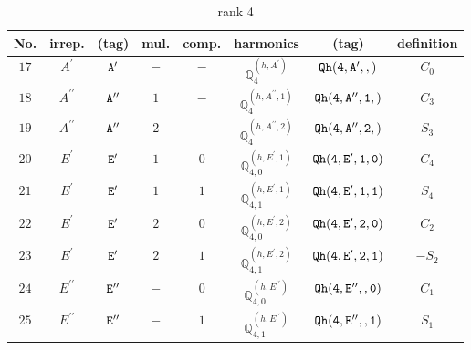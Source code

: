 \documentclass[fleqn,8pt]{jsarticle}
\begin{document}
\begin{table}[ht!]
\begin{center}
\caption{rank 4}
\renewcommand{\arraystretch}{1.3}
\begin{tabular}{cccccccc} \hline \hline
No. & irrep. & (tag) & mul. & comp. & harmonics & (tag) & definition \\ \hline
$ 17 $ & $ A^{\prime} $ & $ {\tt A'} $ & $ - $ & $ - $ & $ \mathbb{Q}_{4}^{(h,A^{\prime})} $ & $ {\tt Qh(4,A',,)} $ & $ C_{0} $ \\
$ 18 $ & $ A^{\prime\prime} $ & $ {\tt A''} $ & $ 1 $ & $ - $ & $ \mathbb{Q}_{4}^{(h,A^{\prime\prime},1)} $ & $ {\tt Qh(4,A'',1,)} $ & $ C_{3} $ \\
$ 19 $ & $ A^{\prime\prime} $ & $ {\tt A''} $ & $ 2 $ & $ - $ & $ \mathbb{Q}_{4}^{(h,A^{\prime\prime},2)} $ & $ {\tt Qh(4,A'',2,)} $ & $ S_{3} $ \\
$ 20 $ & $ E^{\prime} $ & $ {\tt E'} $ & $ 1 $ & $ 0 $ & $ \mathbb{Q}_{4,0}^{(h,E^{\prime},1)} $ & $ {\tt Qh(4,E',1,0)} $ & $ C_{4} $ \\
$ 21 $ & $ E^{\prime} $ & $ {\tt E'} $ & $ 1 $ & $ 1 $ & $ \mathbb{Q}_{4,1}^{(h,E^{\prime},1)} $ & $ {\tt Qh(4,E',1,1)} $ & $ S_{4} $ \\
$ 22 $ & $ E^{\prime} $ & $ {\tt E'} $ & $ 2 $ & $ 0 $ & $ \mathbb{Q}_{4,0}^{(h,E^{\prime},2)} $ & $ {\tt Qh(4,E',2,0)} $ & $ C_{2} $ \\
$ 23 $ & $ E^{\prime} $ & $ {\tt E'} $ & $ 2 $ & $ 1 $ & $ \mathbb{Q}_{4,1}^{(h,E^{\prime},2)} $ & $ {\tt Qh(4,E',2,1)} $ & $ - S_{2} $ \\
$ 24 $ & $ E^{\prime\prime} $ & $ {\tt E''} $ & $ - $ & $ 0 $ & $ \mathbb{Q}_{4,0}^{(h,E^{\prime\prime})} $ & $ {\tt Qh(4,E'',,0)} $ & $ C_{1} $ \\
$ 25 $ & $ E^{\prime\prime} $ & $ {\tt E''} $ & $ - $ & $ 1 $ & $ \mathbb{Q}_{4,1}^{(h,E^{\prime\prime})} $ & $ {\tt Qh(4,E'',,1)} $ & $ S_{1} $ \\
 \hline \hline
\end{tabular}
\end{center}
\end{table}
\end{document}
